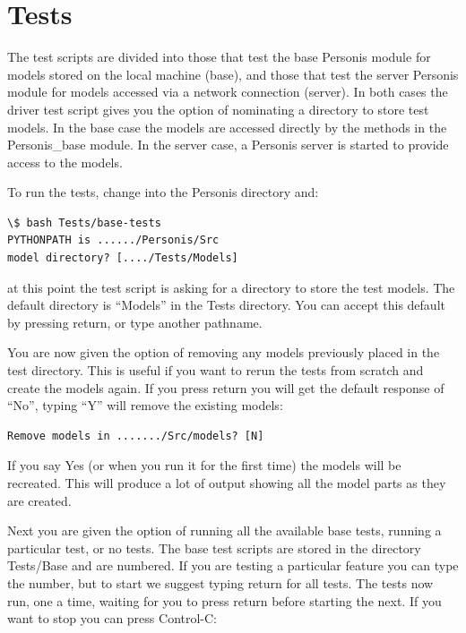 \documentclass[letterpaper,10pt,english]{sphinxmanual}
\begin{document}
\chapter{Tests}
\label{Tests:tests}\label{Tests::doc}
The test scripts are divided into those that test the base Personis
module for models stored on the local machine (base), and those that
test the server Personis module for models accessed via a network
connection (server). In both cases the driver test script gives you the
option of nominating a directory to store test models. In the base case
the models are accessed directly by the methods in the Personis\_base
module. In the server case, a Personis server is started to provide
access to the models.

To run the tests, change into the Personis directory and:

\begin{Verbatim}[commandchars=\\\{\}]
\$ bash Tests/base-tests
PYTHONPATH is ....../Personis/Src
model directory? [..../Tests/Models]
\end{Verbatim}

at this point the test script is asking for a directory to store the test models. The default directory
is ``Models'' in the Tests directory. You can accept this default by pressing return, or type another pathname.

You are now given the option of removing any models previously placed in the test directory. This is useful if
you want to rerun the tests from scratch and create the models again. If you press return you will get
the default response of ``No'', typing ``Y'' will remove the existing models:

\begin{Verbatim}[commandchars=\\\{\}]
Remove models in ......./Src/models? [N]
\end{Verbatim}

If you say Yes (or when you run it for the first time) the models will be recreated.
This will produce a lot of output showing all the model parts as they are created.

Next you are given the option of running all the available base tests, running a particular test, or no tests.
The base test scripts are stored in the directory Tests/Base and are numbered. If you are testing a particular
feature you can type the number, but to start we suggest typing return for all tests.
The tests now run, one a time, waiting for you to press return before starting the next. If you want to stop
you can press Control-C:
\end{document}
